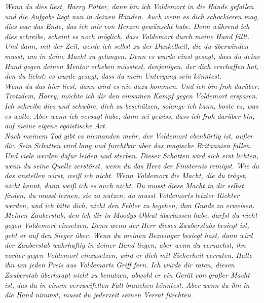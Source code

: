 {\emph{Wenn du dies liest, Harry Potter, dann bin ich Voldemort in die Hände gefallen und die Aufgabe liegt nun in deinen Händen. Auch wenn es dich schockieren mag, dies war das Ende, das ich mir von Herzen gewünscht habe. Denn während ich dies schreibe, scheint es noch möglich, dass Voldemort durch meine Hand fällt.\\ Und dann, mit der Zeit, werde ich selbst zu der Dunkelheit, die du überwinden musst, um in deine Macht zu gelangen. Denn es wurde einst gesagt, dass du deine Hand gegen deinen Mentor erheben müsstest, denjenigen, der dich erschaffen hat, den du liebst; es wurde gesagt, dass du mein Untergang sein könntest.}\\ \emph{\hfill\break Wenn du das hier liest, dann wird es nie dazu kommen. Und ich bin froh darüber. Trotzdem, Harry, möchte ich dir den einsamen Kampf gegen Voldemort ersparen.\\ Ich schreibe dies und schwöre, dich zu beschützen, solange ich kann, koste es, was es wolle. Aber wenn ich versagt habe, dann sei gewiss, dass ich froh darüber bin, auf meine eigene egoistische Art.}\\ \emph{\hfill\break Nach meinem Tod gibt es niemanden mehr, der Voldemort ebenbürtig ist, außer dir. Sein Schatten wird lang und furchtbar über das magische Britannien fallen. Und viele werden dafür leiden und sterben. Dieser Schatten wird sich erst lichten, wenn du seine Quelle zerstörst, wenn du das Herz der Finsternis reinigst. Wie du das anstellen wirst, weiß ich nicht. Wenn Voldemort die Macht, die du trägst, nicht kennt, dann weiß ich es auch nicht. Du musst diese Macht in dir selbst finden, du musst lernen, sie zu nutzen, du musst Voldemorts letzter Richter werden, und ich bitte dich, nicht den Fehler zu begehen, ihm Gnade zu erweisen.}\\ \emph{\hfill\break Meinen Zauberstab, den ich dir in Moodys Obhut überlassen habe, darfst du nicht gegen Voldemort einsetzen. Denn wenn der Herr dieses Zauberstabs besiegt ist, geht er auf den Sieger über. Wenn du meinen Bezwinger besiegt hast, dann wird der Zauberstab wahrhaftig in deiner Hand liegen; aber wenn du versuchst, ihn vorher gegen Voldemort einzusetzen, wird er dich mit Sicherheit verraten. Halte ihn um jeden Preis aus Voldemorts Griff fern. Ich würde dir raten, diesen Zauberstab überhaupt nicht zu benutzen, obwohl er ein Gerät von großer Macht ist, das du in einem verzweifelten Fall brauchen könntest. Aber wenn du ihn in die Hand nimmst, musst du jederzeit seinen Verrat fürchten.}

}
